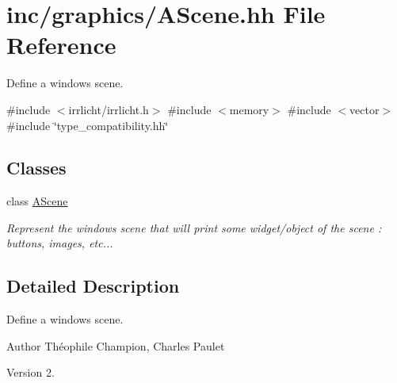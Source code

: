 \hypertarget{AScene_8hh}{}\section{inc/graphics/\+A\+Scene.hh File Reference}
\label{AScene_8hh}


Define a window\textquotesingle{}s scene.  


{\ttfamily \#include $<$irrlicht/irrlicht.\+h$>$}\newline
{\ttfamily \#include $<$memory$>$}\newline
{\ttfamily \#include $<$vector$>$}\newline
{\ttfamily \#include \char`\"{}type\+\_\+compatibility.\+hh\char`\"{}}\newline
\subsection*{Classes}
\begin{DoxyCompactItemize}
\item 
class \hyperlink{classAScene}{A\+Scene}
\begin{DoxyCompactList}\small\item\em Represent the window\textquotesingle{}s scene that will print some widget/object of the scene \+: buttons, images, etc... \end{DoxyCompactList}\end{DoxyCompactItemize}


\subsection{Detailed Description}
Define a window\textquotesingle{}s scene. 

\begin{DoxyAuthor}{Author}
Théophile Champion, Charles Paulet 
\end{DoxyAuthor}
\begin{DoxyVersion}{Version}
2. 
\end{DoxyVersion}
